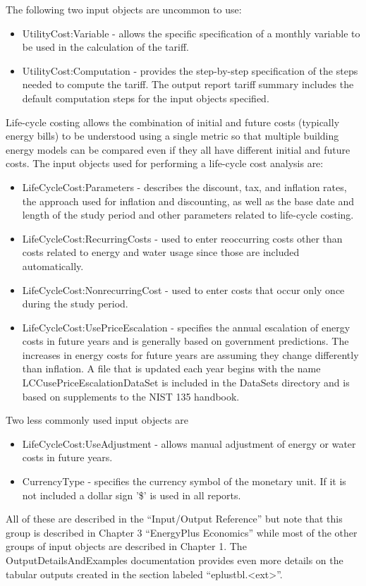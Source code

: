 The following two input objects are uncommon to use:
\begin{itemize}
\item UtilityCost:Variable - allows the specific specification of a monthly
variable to be used in the calculation of the tariff.
\item UtilityCost:Computation - provides the step-by-step specification
of the steps needed to compute the tariff. The output report tariff
summary includes the default computation steps for the input objects
specified.
\end{itemize}
Life-cycle costing allows the combination of initial and future costs
(typically energy bills) to be understood using a single metric so
that multiple building energy models can be compared even if they
all have different initial and future costs. The input objects used
for performing a life-cycle cost analysis are:
\begin{itemize}
\item LifeCycleCost:Parameters - describes the discount, tax, and inflation
rates, the approach used for inflation and discounting, as well as
the base date and length of the study period and other parameters
related to life-cycle costing.
\item LifeCycleCost:RecurringCosts - used to enter reoccurring costs other
than costs related to energy and water usage since those are included
automatically.
\item LifeCycleCost:NonrecurringCost - used to enter costs that occur only
once during the study period.
\item LifeCycleCost:UsePriceEscalation - specifies the annual escalation
of energy costs in future years and is generally based on government
predictions. The increases in energy costs for future years are assuming
they change differently than inflation. A file that is updated each
year begins with the name LCCusePriceEscalationDataSet is included
in the DataSets directory and is based on supplements to the NIST
135 handbook.
\end{itemize}
Two less commonly used input objects are
\begin{itemize}
\item LifeCycleCost:UseAdjustment - allows manual adjustment of energy or
water costs in future years.
\item CurrencyType - specifies the currency symbol of the monetary unit.
If it is not included a dollar sign '\$' is used in all reports.
\end{itemize}
All of these are described in the \textquotedblleft Input/Output Reference\textquotedblright{}
but note that this group is described in Chapter 3 ``EnergyPlus Economics''
while most of the other groups of input objects are described in Chapter
1. The OutputDetailsAndExamples documentation provides even more details
on the tabular outputs created in the section labeled ``eplustbl.<ext>''.

